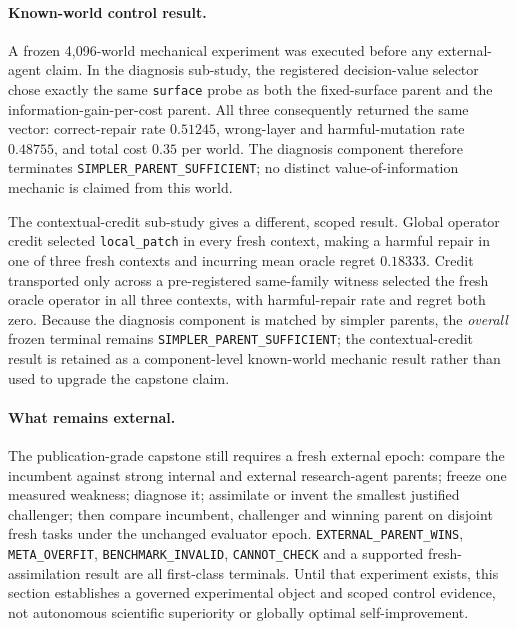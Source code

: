 \paragraph{Known-world control result.}
A frozen 4,096-world mechanical experiment was executed before any external-agent claim.  In the diagnosis sub-study, the registered decision-value selector chose exactly the same \texttt{surface} probe as both the fixed-surface parent and the information-gain-per-cost parent.  All three consequently returned the same vector: correct-repair rate $0.51245$, wrong-layer and harmful-mutation rate $0.48755$, and total cost $0.35$ per world.  The diagnosis component therefore terminates \texttt{SIMPLER\_PARENT\_SUFFICIENT}; no distinct value-of-information mechanic is claimed from this world.

The contextual-credit sub-study gives a different, scoped result.  Global operator credit selected \texttt{local\_patch} in every fresh context, making a harmful repair in one of three fresh contexts and incurring mean oracle regret $0.18333$.  Credit transported only across a pre-registered same-family witness selected the fresh oracle operator in all three contexts, with harmful-repair rate and regret both zero.  Because the diagnosis component is matched by simpler parents, the \emph{overall} frozen terminal remains \texttt{SIMPLER\_PARENT\_SUFFICIENT}; the contextual-credit result is retained as a component-level known-world mechanic result rather than used to upgrade the capstone claim.

\paragraph{What remains external.}
The publication-grade capstone still requires a fresh external epoch: compare the incumbent against strong internal and external research-agent parents; freeze one measured weakness; diagnose it; assimilate or invent the smallest justified challenger; then compare incumbent, challenger and winning parent on disjoint fresh tasks under the unchanged evaluator epoch.  \texttt{EXTERNAL\_PARENT\_WINS}, \texttt{META\_OVERFIT}, \texttt{BENCHMARK\_INVALID}, \texttt{CANNOT\_CHECK} and a supported fresh-assimilation result are all first-class terminals.  Until that experiment exists, this section establishes a governed experimental object and scoped control evidence, not autonomous scientific superiority or globally optimal self-improvement.
